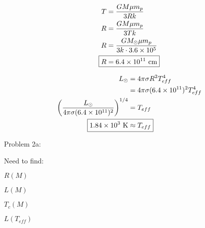 \documentclass[10pt,letter,preprint]{aastex}
\newcommand{\lp}{\left(}
\newcommand{\rp}{\right)}
\begin{document}
\begin{align}
T &= \frac{GM \mu m_p }{3Rk}\\
R &= \frac{GM \mu m_p}{3 T k}\\
R &= \frac{G M_\odot \mu m_p}{3 k \cdot 3.6 \times 10^5}\\
\Aboxed{R &= 6.4 \times 10^{11} \text{ cm}}
\end{align}

\begin{align}
L_\odot & = 4 \pi \sigma R^2 T_{eff}^4\\
&= 4 \pi \sigma (6.4 \times 10^{11})^2 T_{eff}^4\\
\lp \frac{L_\odot}{ 4 \pi \sigma (6.4 \times 10^{11})^2} \rp^{1/4} &= T_{eff}\\
\Aboxed{1.84 \times 10^3 \text{ K} &\approx T_{eff}}
\end{align}

Problem 2a:

Need to find:

\begin{list}{*}{}
  \item $R(M)$
  \item $L(M)$
  \item $T_c(M)$
  \item $L(T_{eff})$
\end{list}
\end{document}

